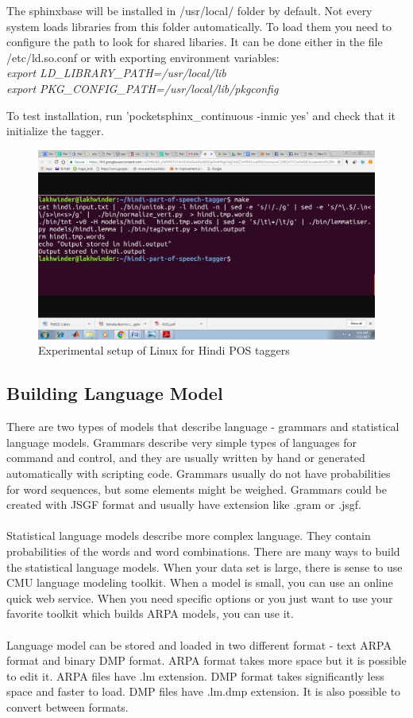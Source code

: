\documentclass[12pt,a4paper,oneside]{memoir}
\begin{document}
The sphinxbase will be installed in /usr/local/ folder by default. Not every system loads libraries from this folder automatically. To load them you need to configure the path to look for shared libaries. It can be done either in the file /etc/ld.so.conf or with exporting environment variables:
\\
\textit{export LD\_LIBRARY\_PATH=/usr/local/lib} \\
\textit{export PKG\_CONFIG\_PATH=/usr/local/lib/pkgconfig}


To test installation, run 'pocketsphinx\_continuous -inmic yes' and check that it initialize the tagger. 

\begin{figure}[h]
    \centering
    \includegraphics[scale=0.3]{jagjit1}
    \caption{Experimental setup of Linux for Hindi POS taggers}
\end{figure}

\subsection{Building Language Model}


There are two types of models that describe language - grammars and statistical language models. Grammars describe very simple types of languages for command and control, and they are usually written by hand or generated automatically with scripting code. Grammars usually do not have probabilities for word sequences, but some elements might be weighed. Grammars could be created with JSGF format and usually have extension like .gram or .jsgf.\\\\
Statistical language models describe more complex language. They contain probabilities of the words and word combinations. There are many ways to build the statistical language models. When your data set is large, there is sense to use CMU language modeling toolkit. When a model is small, you can use an online quick web service. When you need specific options or you just want to use your favorite toolkit which builds ARPA models, you can use it.
\\\\
Language model can be stored and loaded in two different format - text ARPA format and binary DMP format. ARPA format takes more space but it is possible to edit it. ARPA files have .lm extension. DMP format takes significantly less space and faster to load. DMP files have .lm.dmp extension. It is also possible to convert between formats.
\end{document}
